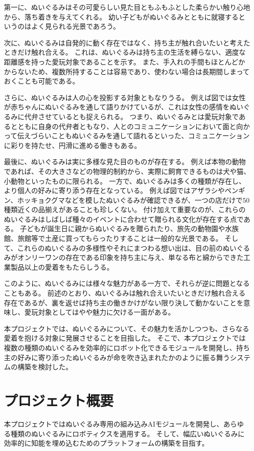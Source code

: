 \documentclass[uplatex,a4paper,12pt]{jsarticle}
\begin{document}
第一に、ぬいぐるみはその可愛らしい見た目ともふもふとした柔らかい触り心地から、落ち着きを与えてくれる。
幼い子どもがぬいぐるみとともに就寝するというのはよく見られる光景であろう。

次に、ぬいぐるみは自発的に動く存在ではなく、持ち主が触れ合いたいと考えたときだけ触れ合える。
これは、ぬいぐるみは持ち主の生活を縛らない、適度な距離感を持った愛玩対象であることを示す。
また、手入れの手間もほとんどかからないため、複数所持することは容易であり、使わない場合は長期間しまっておくことも可能である。

さらに、ぬいぐるみは人の心を投影する対象ともなりうる。
例えば図では女性が赤ちゃんにぬいぐるみを通して語りかけているが、これは女性の感情をぬいぐるみに代弁させているとも捉えられる。
つまり、ぬいぐるみとは愛玩対象であるとともに自身の代弁者ともなり、人とのコミュニケーションにおいて面と向かって伝えづらいこともぬいぐるみを通して語れるといった、コミュニケーションに彩りを持たせ、円滑に進める働きもある。

最後に、ぬいぐるみは実に多様な見た目のものが存在する。
例えば本物の動物であれば、その大きさなどの物理的制約から、実際に飼育できるものは犬や猫、小動物といったものに限られる。
一方で、ぬいぐるみは多くの種類が存在し、より個人の好みに寄り添う存在となっている。
例えば図ではアザラシやペンギン、ホッキョクグマなどを模したぬいぐるみが確認できるが、一つの店だけで50種類近くの品揃えがあることも珍しくない。
付け加えて重要なのが、これらのぬいぐるみはしばしば種々のイベントに合わせて贈られる文化が存在する点である。
子どもが誕生日に親からぬいぐるみを贈られたり、旅先の動物園や水族館、旅館等で土産に買ってもらったりすることは一般的な光景である。
そして、これらのぬいぐるみの多様性やそれにまつわる想い出は、目の前のぬいぐるみがオンリーワンの存在である印象を持ち主に与え、単なる布と綿からできた工業製品以上の愛着をもたらしうる。

このように、ぬいぐるみには様々な魅力がある一方で、それらが逆に問題となることもある。
前述のとおり、ぬいぐるみは触れ合えいたいときだけ触れ合える存在であるが、裏を返せば持ち主の働きかけがない限り決して動かないことを意味し、愛玩対象としてはやや魅力に欠ける一面がある。

本プロジェクトでは、ぬいぐるみについて、その魅力を活かしつつも、さらなる愛着を抱ける対象に発展させることを目指した。
そこで、本プロジェクトでは複数の種類のぬいぐるみを効率的にロボット化できるモジュールを開発し、持ち主の好みに寄り添ったぬいぐるみが命を吹き込まれたかのように振る舞うシステムの構築を検討した。



\section{プロジェクト概要}
本プロジェクトではぬいぐるみ専用の組み込みAIモジュールを開発し、あらゆる種類のぬいぐるみにロボティクスを適用する。
そして、幅広いぬいぐるみに効率的に知能を埋め込むためのプラットフォームの構築を目指す。
\end{document}
